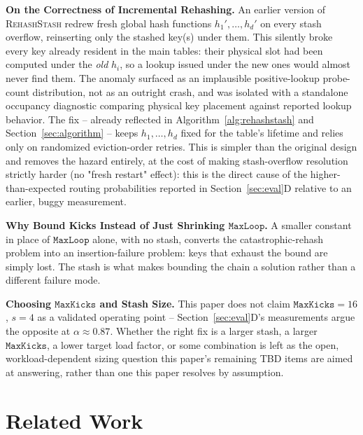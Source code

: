 \documentclass[conference]{IEEEtran}
\let\oldtextsc\textsc
\renewcommand{\textsc}[1]{\textup{\oldtextsc{#1}}}
\begin{document}
	\textbf{On the Correctness of Incremental Rehashing.} An earlier
	version of \textsc{RehashStash} redrew fresh global hash functions
	$h_1',\dots,h_d'$ on every stash overflow, reinserting only the
	stashed key(s) under them. This silently broke every key already
	resident in the main tables: their physical slot had been computed
	under the \emph{old} $h_i$, so a lookup issued under the new ones would
	almost never find them. The anomaly surfaced as an implausible
	positive-lookup probe-count distribution, not as an outright crash,
	and was isolated with a standalone occupancy diagnostic comparing
	physical key placement against reported lookup behavior. The fix --
	already reflected in Algorithm~\ref{alg:rehashstash} and
	Section~\ref{sec:algorithm} -- keeps $h_1,\dots,h_d$ fixed for the
	table's lifetime and relies only on randomized eviction-order retries.
	This is simpler than the original design and removes the hazard
	entirely, at the cost of making stash-overflow resolution strictly
	harder (no "fresh restart" effect): this is the direct cause of the
	higher-than-expected routing probabilities reported in
	Section~\ref{sec:eval}D relative to an earlier, buggy measurement.
	
	\textbf{Why Bound Kicks Instead of Just Shrinking $\mathtt{MaxLoop}$.}
	A smaller constant in place of $\mathtt{MaxLoop}$ alone, with no
	stash, converts the catastrophic-rehash problem into an
	insertion-failure problem: keys that exhaust the bound are simply lost.
	The stash is what makes bounding the chain a solution rather than a
	different failure mode.
	
	\textbf{Choosing $\mathtt{MaxKicks}$ and Stash Size.} This paper does
	not claim $\mathtt{MaxKicks}=16$, $s=4$ as a validated operating point
	-- Section~\ref{sec:eval}D's measurements argue the opposite at
	$\alpha\approx0.87$. Whether the right fix is a larger stash, a larger
	$\mathtt{MaxKicks}$, a lower target load factor, or some combination is
	left as the open, workload-dependent sizing question this paper's
	remaining TBD items are aimed at answering, rather than one this paper
	resolves by assumption.
	
	\section{Related Work}
	\label{sec:related}
	
\end{document}
